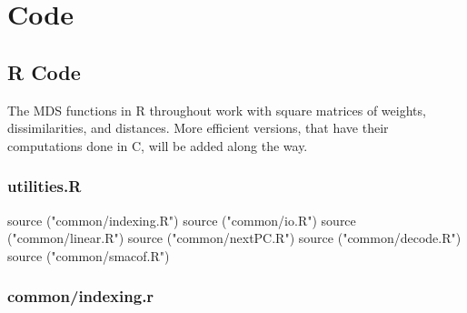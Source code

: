 \documentclass[
  12pt,
  letterpaper,
  DIV=11,
  numbers=noendperiod]{scrreprt}
\newenvironment{Shaded}{\begin{snugshade}}{\end{snugshade}}
\newcommand{\FunctionTok}[1]{\textcolor[rgb]{0.28,0.35,0.67}{#1}}
\newcommand{\NormalTok}[1]{\textcolor[rgb]{0.00,0.23,0.31}{#1}}
\newcommand{\StringTok}[1]{\textcolor[rgb]{0.13,0.47,0.30}{#1}}
\theoremstyle{remark}
\begin{document}


\chapter*{Code}\label{apcode}


\section*{R Code}\label{rapcode}


The MDS functions in R throughout work with square matrices of weights,
dissimilarities, and distances. More efficient versions, that have their
computations done in C, will be added along the way.

\subsection*{utilities.R}\label{aputilitiescode}

\begin{Shaded}
\begin{Highlighting}[]
\FunctionTok{source}\NormalTok{ (}\StringTok{"common/indexing.R"}\NormalTok{)}
\FunctionTok{source}\NormalTok{ (}\StringTok{"common/io.R"}\NormalTok{)}
\FunctionTok{source}\NormalTok{ (}\StringTok{"common/linear.R"}\NormalTok{)}
\FunctionTok{source}\NormalTok{ (}\StringTok{"common/nextPC.R"}\NormalTok{)}
\FunctionTok{source}\NormalTok{ (}\StringTok{"common/decode.R"}\NormalTok{)}
\FunctionTok{source}\NormalTok{ (}\StringTok{"common/smacof.R"}\NormalTok{)}
\end{Highlighting}
\end{Shaded}

\subsection*{common/indexing.r}\label{apindexingcode}
\end{document}
